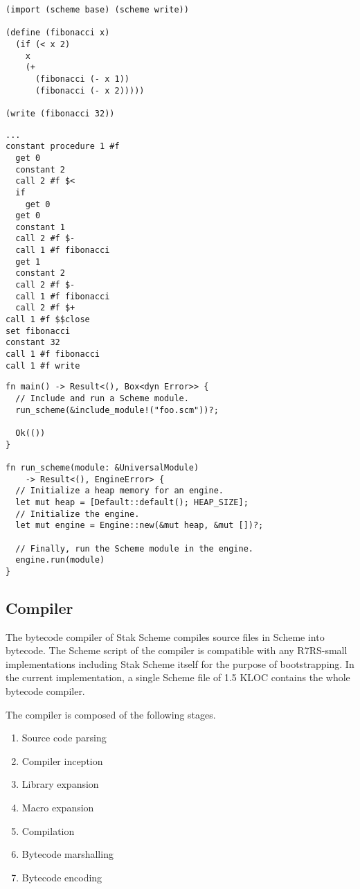 \documentclass[sigplan, anonymous, review]{acmart}
\begin{document}
\begin{lstlisting}[float, caption=\texttt{foo.scm} file, label=list:scheme]
(import (scheme base) (scheme write))

(define (fibonacci x)
  (if (< x 2)
    x
    (+
      (fibonacci (- x 1))
      (fibonacci (- x 2)))))

(write (fibonacci 32))
\end{lstlisting}

\begin{lstlisting}[float, caption=Disassembled \texttt{foo.bc} file, label=list:bytecode]
...
constant procedure 1 #f
  get 0
  constant 2
  call 2 #f $<
  if
    get 0
  get 0
  constant 1
  call 2 #f $-
  call 1 #f fibonacci
  get 1
  constant 2
  call 2 #f $-
  call 1 #f fibonacci
  call 2 #f $+
call 1 #f $$close
set fibonacci
constant 32
call 1 #f fibonacci
call 1 #f write
\end{lstlisting}

\begin{lstlisting}[float, caption=\texttt{main.rs} file, label=list:rust]
fn main() -> Result<(), Box<dyn Error>> {
  // Include and run a Scheme module.
  run_scheme(&include_module!("foo.scm"))?;

  Ok(())
}

fn run_scheme(module: &UniversalModule)
    -> Result<(), EngineError> {
  // Initialize a heap memory for an engine.
  let mut heap = [Default::default(); HEAP_SIZE];
  // Initialize the engine.
  let mut engine = Engine::new(&mut heap, &mut [])?;

  // Finally, run the Scheme module in the engine.
  engine.run(module)
}
\end{lstlisting}

\subsection{Compiler} \label{compiler}

The bytecode compiler of Stak Scheme compiles source files in Scheme
into bytecode.
The Scheme script of the compiler is compatible with any R7RS-small
implementations including Stak Scheme itself for the purpose of bootstrapping.
In the current implementation, a single Scheme file of 1.5 KLOC
contains the whole bytecode compiler.

The compiler is composed of the following stages.

\begin{enumerate}
  \item Source code parsing
  \item Compiler inception
  \item Library expansion
  \item Macro expansion
  \item Compilation
  \item Bytecode marshalling
  \item Bytecode encoding
\end{enumerate}
\end{document}
